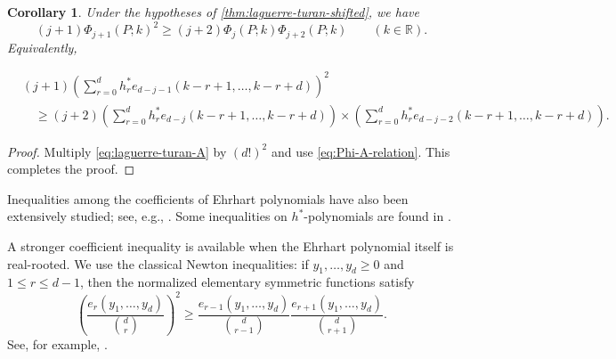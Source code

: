 \documentclass[reqno, 12pt]{article}
\numberwithin{equation}{section}
\newtheorem{corollary}[theorem]{Corollary}
\theoremstyle{definition}
\newcommand{\R}{\mathbb{R}}
\begin{document}
\begin{corollary}\label{cor:laguerre-hstar}
Under the hypotheses of \cref{thm:laguerre-turan-shifted}, we have 
\begin{equation*}
(j+1)\Phi_{j+1}(P;k)^2\geq(j+2)\Phi_j(P;k)\Phi_{j+2}(P;k) \qquad(k\in\R).
\end{equation*}
Equivalently,
\begin{small}
\begin{align*}
&(j+1)\left(\sum_{r=0}^{d}h_r^* e_{d-j-1}(k-r+1,\ldots,k-r+d)\right)^2\\ &\quad\geq(j+2)\left(\sum_{r=0}^{d}h_r^*e_{d-j}(k-r+1,\ldots,k-r+d)\right)
 \times\left(\sum_{r=0}^{d}h_r^*e_{d-j-2}(k-r+1,\ldots,k-r+d)\right).
\end{align*}
\end{small}
\end{corollary}
\begin{proof}
Multiply \eqref{eq:laguerre-turan-A} by $(d!)^2$ and use \eqref{eq:Phi-A-relation}. This completes the proof.
\end{proof}

Inequalities among the coefficients of Ehrhart polynomials have also been extensively studied; see, e.g., \cite{BeckEtAl2005,Betke-McMullen,Hibi1995,Stanley1980,Stanley-Cohen-Macau}.
Some inequalities on $h^*$-polynomials are found in \cite[Chapter 10.4]{BeckRobins2015}.


A stronger coefficient inequality is available when the Ehrhart polynomial itself is real-rooted.  We use the classical Newton
inequalities: if $y_1,\ldots,y_d\geq0$ and $1\leq r\leq d-1$, then the normalized elementary symmetric functions satisfy
\[\left(\frac{e_r(y_1,\ldots,y_d)}{\binom dr}\right)^2\geq\frac{e_{r-1}(y_1,\ldots,y_d)}{\binom d{r-1}} \frac{e_{r+1}(y_1,\ldots,y_d)}{\binom d{r+1}}.
\]
See, for example, \cite{Branden2015,RahmanSchmeisser2002}.
\end{document}
